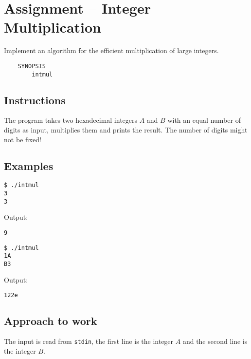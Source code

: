 
\usepackage{amsmath}



\section*{ Assignment -- Integer Multiplication}
Implement an algorithm for the efficient multiplication of large integers. 
\begin{verbatim}
    SYNOPSIS
        intmul
\end{verbatim}

\subsection*{Instructions}
The program takes two hexadecimal integers $A$ and $B$ with an equal number of digits as input, multiplies them and prints the result. The number of digits might not be fixed!
\subsection*{Examples}
\begin{verbatim}
$ ./intmul
3
3
\end{verbatim}
Output: 
\begin{verbatim}
9
\end{verbatim}
\begin{verbatim}
$ ./intmul
1A
B3
\end{verbatim}
Output: 
\begin{verbatim}
122e
\end{verbatim}
\subsection*{Approach to work}
The input is read from \texttt{stdin}, the first line is the integer $A$ and the second line is the integer $B$.

